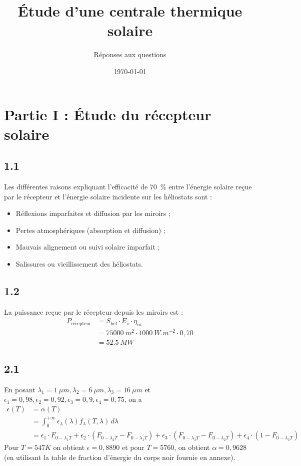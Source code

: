 \documentclass[12pt]{article}
\title{Étude d'une centrale thermique solaire}
\author{Réponses aux questions}
\date{\today}
\begin{document}
\maketitle

\section*{Partie I : Étude du récepteur solaire}

\subsection*{1.1}
Les différentes raisons expliquant l'efficacité de \SI{70}{\percent} entre l'énergie solaire reçue par le récepteur et l'énergie solaire incidente sur les héliostats sont :
\begin{itemize}
  \item Réflexions imparfaites et diffusion par les miroirs ;
  \item Pertes atmosphériques (absorption et diffusion) ;
  \item Mauvais alignement ou suivi solaire imparfait ;
  \item Salissures ou vieillissement des héliostats.
\end{itemize}

\subsection*{1.2}
La puissance reçue par le récepteur depuis les miroirs est :
\begin{align*}
P_{\text{récepteur}} &= S_{\text{hel}} \cdot E_s \cdot \eta_m \\
&= \SI{75000}{m^2} \cdot \SI{1000}{W.m^{-2}} \cdot 0{,}70 \\
&= \boxed{\SI{52.5}{MW}}
\end{align*}

\subsection*{2.1}
En posant $\lambda_1=\SI{1}{\mu m}, \lambda_2=\SI{6}{\mu m}, \lambda_3=\SI{16}{\mu m}$ et $\epsilon_1=0,98, \epsilon_2 = 0,92, \epsilon_3 = 0,9, \epsilon_4 = 0,75$, on a
\begin{align*}
\epsilon(T) &= \alpha(T) \\ &= \int_{0}^{+\infty} \epsilon_{\lambda}(\lambda) f_{\lambda}(T, \lambda) \, d\lambda \\ &= \epsilon_1 \cdot F_{0-\lambda_{1} T} + \epsilon_2 \cdot (F_{0-\lambda_{2} T} - F_{0-\lambda_{1} T}) + \epsilon_3 \cdot (F_{0-\lambda_{3} T} - F_{0-\lambda_{2} T}) + \epsilon_4 \cdot (1 - F_{0-\lambda_{3} T})
\end{align*}
Pour $T=547K$ on obtient $\boxed{\epsilon=0,8890}$ et pour $T=5760$, on obtient $\boxed{\alpha=0,9628}$ (en utilisant la table de fraction d'énergie du corps noir fournie en annexe).
\end{document}
